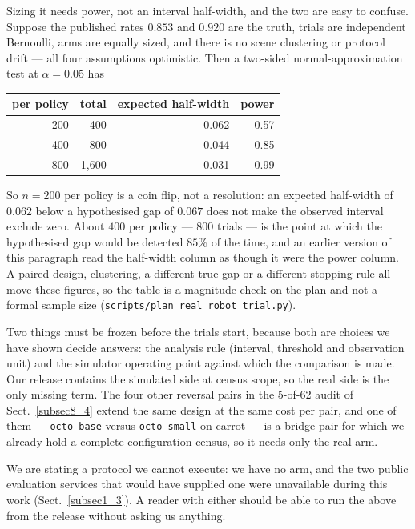 \documentclass[pdflatex,iicol,sn-apa]{sn-jnl}
\theoremstyle{remark}
\begin{document}
\begin{enumerate}
Sizing it needs power, not an interval half-width, and the two are easy to confuse. Suppose the
published rates $0.853$ and $0.920$ are the truth, trials are independent Bernoulli, arms are
equally sized, and there is no scene clustering or protocol drift --- all four assumptions
optimistic. Then a two-sided normal-approximation test at $\alpha = 0.05$ has

\begin{table}[h]
\centering
\begin{tabular}{@{}rrrr@{}}
\toprule
per policy & total & expected half-width & power \\
\midrule
200 & 400 & 0.062 & 0.57 \\
400 & 800 & 0.044 & 0.85 \\
800 & 1{,}600 & 0.031 & 0.99 \\
\bottomrule
\end{tabular}
\end{table}

\noindent So $n = 200$ per policy is a coin flip, not a resolution: an expected half-width of $0.062$
below a hypothesised gap of $0.067$ does not make the observed interval exclude zero. About
$400$ per policy --- $800$ trials --- is the point at which the hypothesised gap would be detected
$85\%$ of the time, and an earlier version of this paragraph read the half-width column as though it
were the power column. A paired design, clustering, a different true gap or a different stopping
rule all move these figures, so the table is a magnitude check on the plan and not a formal sample
size (\texttt{scripts/plan\_real\_robot\_trial.py}).

Two things must be frozen before the trials start, because both are choices we have shown decide
answers: the analysis rule (interval, threshold and observation unit) and the simulator operating
point against which the comparison is made. Our release contains the simulated side at census scope,
so the real side is the only missing term. The four other reversal pairs in the 5-of-62 audit of
Sect.~\ref{subsec8_4} extend the same design at the same cost per pair, and one of them ---
\texttt{octo-base} versus \texttt{octo-small} on carrot --- is a bridge pair for which we already
hold a complete configuration census, so it needs only the real arm.

We are stating a protocol we cannot execute: we have no arm, and the two public evaluation services
that would have supplied one were unavailable during this work (Sect.~\ref{subsec1_3}). A reader
with either should be able to run the above from the release without asking us anything.


\end{enumerate}
\end{document}
